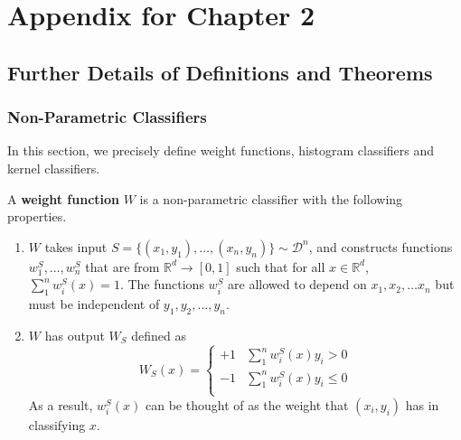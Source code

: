 \graphicspath{{./chapters/chapter1/}}

\def\supp{supp}
\def\D{{\mathcal D}}
\def\U{{\mathcal U}}
\def\V{{\mathcal V}}
\def\X{\mathcal X}
\def\R{\mathbb R}
\def\Y{\{\pm 1\}}
\def\d{\rho}
\def\E{\mathbb{E}}
\def\N{\mathbb{N}}
\def\g{g}
\def\A{\mathcal{A}}
\def\nat{g_{neighbor}}
\def\bad{\D_{1/2}^{-}}
\def\natural{neighborhood preserving}
\def\Natural{Neighborhood preserving}
\def\ncons{neighborhood}
\def\Ncons{Neighborhood}

\def\calD{\mathcal{D}}
\def\calU{\mathcal{U}}
\def\calV{\mathcal{V}}

\chapter{Appendix for Chapter 2}

\section{Further Details of Definitions and Theorems}

\subsection{Non-Parametric Classifiers}

In this section, we precisely define weight functions, histogram classifiers and kernel classifiers.

\begin{defn} \label{def:weight_chap_1} 
\cite{devroye96} A \textbf{weight function} $W$ is a non-parametric classifier with the following properties.
\begin{enumerate}
	\item $W$ takes input $S = \{(x_1, y_1), \dots, (x_n, y_n)\} \sim \D^n$, and constructs functions $w_1^S, \dots, w_n^S$ that are from $\R^d \to [0, 1]$ such that for all $x \in \R^d$, $\sum_1^n w_i^S(x) = 1$. The functions $w_i^S$ are allowed to depend on $x_1, x_2, \dots x_n$ but must be independent of $y_1, y_2, \dots, y_n$. 
	\item $W$ has output $W_S$ defined as \[ W_S(x) = \begin{cases} 
      +1 & \sum_1^n w_i^S(x)y_i > 0 \\
      -1 & \sum_1^n w_i^S(x)y_i \leq 0 \\
   \end{cases}
\]
As a result, $w_i^S(x)$ can be thought of as the weight that $(x_i, y_i)$ has in classifying $x$.
\end{enumerate}
\end{defn}

